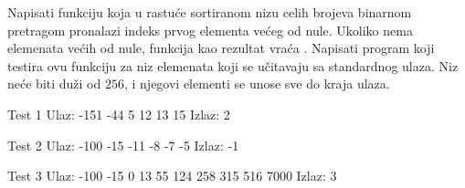 \begin{Answer}[ref=406]
\end{Answer}
\begin{Exercise}[label=407]
Napisati funkciju koja u rastuće sortiranom nizu celih brojeva
binarnom pretragom pronalazi indeks prvog elementa većeg od nule. Ukoliko nema elemenata
većih od nule, funkcija kao rezultat vraća . Napisati
program koji testira ovu funkciju za niz elemenata koji se
učitavaju sa standardnog ulaza. Niz neće biti duži od
$256$, i njegovi elementi se unose sve do kraja ulaza.

\begin{minitest}
\begin{test}{Test 1}
Ulaz:  -151 -44 5 
       12 13 15
Izlaz: 2
\end{test}
\end{minitest}
\begin{minitest}
\begin{test}{Test 2}
Ulaz:  -100 -15 -11 
       -8 -7 -5
Izlaz: -1
\end{test}
\end{minitest}
\begin{minitest}
\begin{test}{Test 3}
Ulaz:  -100 -15 0 13 
       55 124 258 
       315 516 7000
Izlaz: 3
\end{test}
\end{minitest}


\end{Exercise}
\begin{Answer}[ref=407]
\end{Answer}
